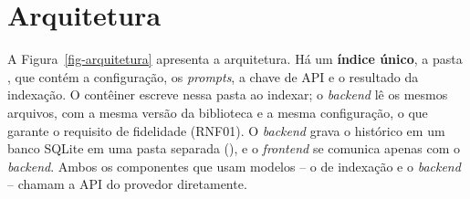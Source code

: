 \section{Arquitetura}
\label{sec-aplicacao-arquitetura}

A Figura~\ref{fig-arquitetura} apresenta a arquitetura. Há um \textbf{índice único}, a pasta , que contém a configuração, os \textit{prompts}, a chave de API e o resultado da indexação. O contêiner  escreve nessa pasta ao indexar; o \textit{backend} lê os mesmos arquivos, com a mesma versão da biblioteca e a mesma configuração, o que garante o requisito de fidelidade (RNF01). O \textit{backend} grava o histórico em um banco SQLite em uma pasta separada (), e o \textit{frontend} se comunica apenas com o \textit{backend}. Ambos os componentes que usam modelos -- o de indexação e o \textit{backend} -- chamam a API do provedor diretamente.

